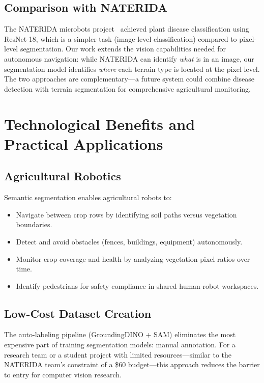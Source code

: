 \documentclass[12pt,a4paper]{article}
\begin{document}
\subsection{Comparison with NATERIDA}

The NATERIDA microbots project~\cite{naterida} achieved plant disease classification using ResNet-18, which is a simpler task (image-level classification) compared to pixel-level segmentation. Our work extends the vision capabilities needed for autonomous navigation: while NATERIDA can identify \emph{what} is in an image, our segmentation model identifies \emph{where} each terrain type is located at the pixel level. The two approaches are complementary---a future system could combine disease detection with terrain segmentation for comprehensive agricultural monitoring.

\section{Technological Benefits and Practical Applications}
\label{sec:applications}

\subsection{Agricultural Robotics}

Semantic segmentation enables agricultural robots to:
\begin{itemize}[noitemsep]
    \item Navigate between crop rows by identifying soil paths versus vegetation boundaries.
    \item Detect and avoid obstacles (fences, buildings, equipment) autonomously.
    \item Monitor crop coverage and health by analyzing vegetation pixel ratios over time.
    \item Identify pedestrians for safety compliance in shared human-robot workspaces.
\end{itemize}

\subsection{Low-Cost Dataset Creation}

The auto-labeling pipeline (GroundingDINO + SAM) eliminates the most expensive part of training segmentation models: manual annotation. For a research team or a student project with limited resources---similar to the NATERIDA team's constraint of a \$60 budget---this approach reduces the barrier to entry for computer vision research.
\end{document}
